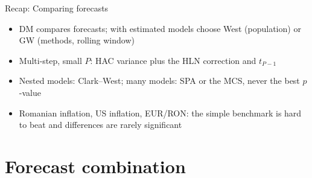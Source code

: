 \begin{frame}{Recap: Comparing forecasts}
\itemsize{\small}
\begin{itemize}
    \item DM compares forecasts; with estimated models choose West (population) or GW (methods, rolling window)
    \item Multi-step, small $P$: HAC variance plus the HLN correction and $t_{P-1}$
    \item Nested models: Clark--West; many models: SPA or the MCS, never the best $p$-value
    \item Romanian inflation, US inflation, EUR/RON: the simple benchmark is hard to beat and differences are rarely significant
\end{itemize}
\end{frame}


\section{Forecast combination}

